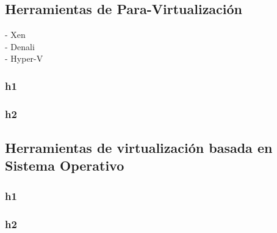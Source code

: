 \subsection{Herramientas de Para-Virtualización}
\vspace{5mm}

- Xen\\
- Denali\\
- Hyper-V\\



\subsubsection{h1}
\vspace{5mm}
\subsubsection{h2}
\vspace{5mm}

\subsection{Herramientas de virtualización basada en Sistema Operativo}
\vspace{5mm}
\subsubsection{h1}
\vspace{5mm}
\subsubsection{h2}
\vspace{5mm}

